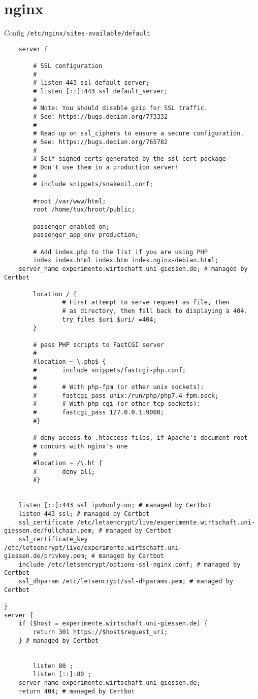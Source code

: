 \documentclass{article}
\begin{document}
\section{nginx}
Config \verb|/etc/nginx/sites-available/default|
\begin{lstlisting}
    server {

        # SSL configuration
        #
        # listen 443 ssl default_server;
        # listen [::]:443 ssl default_server;
        #
        # Note: You should disable gzip for SSL traffic.
        # See: https://bugs.debian.org/773332
        #
        # Read up on ssl_ciphers to ensure a secure configuration.
        # See: https://bugs.debian.org/765782
        #
        # Self signed certs generated by the ssl-cert package
        # Don't use them in a production server!
        #
        # include snippets/snakeoil.conf;

        #root /var/www/html;
        root /home/tux/hroot/public;

        passenger_enabled on;
        passenger_app_env production;

        # Add index.php to the list if you are using PHP
        index index.html index.htm index.nginx-debian.html;
    server_name experimente.wirtschaft.uni-giessen.de; # managed by Certbot

        location / {
                # First attempt to serve request as file, then
                # as directory, then fall back to displaying a 404.
                try_files $uri $uri/ =404;
        }

        # pass PHP scripts to FastCGI server
        #
        #location ~ \.php$ {
        #       include snippets/fastcgi-php.conf;
        #
        #       # With php-fpm (or other unix sockets):
        #       fastcgi_pass unix:/run/php/php7.4-fpm.sock;
        #       # With php-cgi (or other tcp sockets):
        #       fastcgi_pass 127.0.0.1:9000;
        #}

        # deny access to .htaccess files, if Apache's document root
        # concurs with nginx's one
        #
        #location ~ /\.ht {
        #       deny all;
        #}


    listen [::]:443 ssl ipv6only=on; # managed by Certbot
    listen 443 ssl; # managed by Certbot
    ssl_certificate /etc/letsencrypt/live/experimente.wirtschaft.uni-giessen.de/fullchain.pem; # managed by Certbot
    ssl_certificate_key /etc/letsencrypt/live/experimente.wirtschaft.uni-giessen.de/privkey.pem; # managed by Certbot
    include /etc/letsencrypt/options-ssl-nginx.conf; # managed by Certbot
    ssl_dhparam /etc/letsencrypt/ssl-dhparams.pem; # managed by Certbot

}
server {
    if ($host = experimente.wirtschaft.uni-giessen.de) {
        return 301 https://$host$request_uri;
    } # managed by Certbot


        listen 80 ;
        listen [::]:80 ;
    server_name experimente.wirtschaft.uni-giessen.de;
    return 404; # managed by Certbot
\end{lstlisting}
\end{document}
